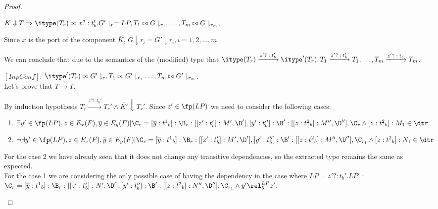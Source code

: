 \begin{proof}
\begin{itemize}
$K\Downarrow T\Rightarrow\itype(T_r)\bowtie x?:t_b'.G'\downharpoonright_{r}=LP, T_1\bowtie G\downharpoonright_{r_1},\dots, T_m \bowtie G\downharpoonright_{r_m}$.

Since $x$ is the port of the component $\overline{K}$, $G\downharpoonright{r_i}=G'\downharpoonright{r_i}, i=1,2,\dots, m.$

We can conclude that due to the semantics of the (modified) type that   $\itype(T_r)\xrightarrow{\text{$z'?:t_b'$}}\itype'(T_r), T_1\xrightarrow{\text{$z'?:t_b'$}}T_1,\dots, T_m\xrightarrow{\text{$z'?:t_b$}}T_m$.

$[InpConf]$: $\itype'(T_r)\bowtie G'\downharpoonright_{r}, T_1\bowtie G'\downharpoonright_{r_1}\dots, T_m\bowtie G'\downharpoonright_{r_m}$. \\

Let's prove that $T\xrightarrow{\text{$\tau$}}T$.



By induction hypothesis $T_r\xrightarrow{\text{$z'?:t_b'$}} T_r' \wedge \overline{K'}\Downarrow T_r'$. Since $z'\in \fp(LP)$ we need to consider the following cases: \\


\begin{enumerate}

\item $\exists y'\in \fp(LP), z \in E_x(F),\overline{y}\in E_y(F)|   \C_r=[\overline{y}:{t^1}_b]:\B_r:[[z':t_b']:M',\D'],[y':t_b'']:\B':[[z:{t^2}_b]:M'',\D''],\C_r \wedge [z:{t^2}_b]:M_1 \in \dtr$

\item $\neg \exists y'\in \fp(LP), z \in E_x(F),\overline{y}\in E_y(F)|   \C_r=[\overline{y}:{t^1}_b]:\B_r:[[z':t_b']:M',\D'],[y':t_b'']:\B':[[z:{t^2}_b]:M'',\D''],\C_{r_1} \wedge [z:{t^2}_b]:N_1 \in \dtr$



\end{enumerate}

For the case 2 we have already seen that it does not change any transitive dependencies, so the extracted  type remains the same as expected.\\


For the case 1 we are considering the only possible case of having the dependency in the case where $LP=z'?:t_b'.LP'$ :\\ $\C_r=[\overline{y}:{t^1}_b]:\B_r:[[z':t_b']:N',\D'],[y':t_b'']:\B':[[z:{t^2}_b]:N'',\D''],\C_{r_1 }\wedge y' \rel^{LP}_5 z'.$ \\


\end{itemize}
\end{proof}

